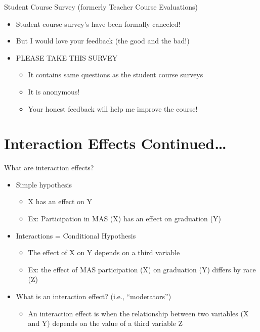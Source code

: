 \documentclass[8pt,ignorenonframetext,dvipsnames]{beamer}
\providecommand{\tightlist}{%
  \setlength{\itemsep}{0pt}\setlength{\parskip}{0pt}}
\let\olditem\item
\renewcommand{\item}{%
  \olditem\vspace{4pt}
}
\begin{document}
\begin{frame}{Student Course Survey (formerly Teacher Course
Evaluations)}
\protect\hypertarget{student-course-survey-formerly-teacher-course-evaluations}{}

\begin{itemize}
\tightlist
\item
  Student course survey's have been formally canceled!
\item
  But I would love your feedback (the good and the bad!)
\item
  PLEASE TAKE THIS SURVEY

  \begin{itemize}
  \tightlist
  \item
    It contains same questions as the student course surveys
  \item
    It is anonymous!
  \item
    Your honest feedback will help me improve the course!
  \end{itemize}
\end{itemize}

\end{frame}

\hypertarget{interaction-effects-continued}{%
\section{Interaction Effects
Continued\ldots{}}\label{interaction-effects-continued}}

\begin{frame}{What are interaction effects?}
\protect\hypertarget{what-are-interaction-effects}{}

\begin{itemize}
\tightlist
\item
  Simple hypothesis

  \begin{itemize}
  \tightlist
  \item
    X has an effect on Y
  \item
    Ex: Participation in MAS (X) has an effect on graduation (Y)
  \end{itemize}
\item
  Interactions = Conditional Hypothesis

  \begin{itemize}
  \tightlist
  \item
    The effect of X on Y depends on a third variable
  \item
    Ex: the effect of MAS participation (X) on graduation (Y) differs by
    race (Z)
  \end{itemize}
\item
  What is an interaction effect? (i.e., ``moderators'')

  \begin{itemize}
  \tightlist
  \item
    An interaction effect is when the relationship between two variables
    (X and Y) depends on the value of a third variable Z
  \end{itemize}
\end{itemize}

\end{frame}
\end{document}
